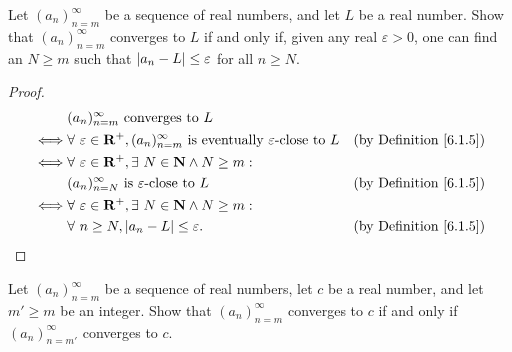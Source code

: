\begin{exercise}\label{ex 6.1.2}
    Let \((a_n)_{n = m}^\infty\) be a sequence of real numbers, and let \(L\) be a real number.
    Show that \((a_n)_{n = m}^\infty\) converges to \(L\) if and only if, given any real \(\varepsilon > 0\), one can find an \(N \geq m\) such that \(\abs*{a_n - L} \leq \varepsilon\) for all \(n \geq N\).
\end{exercise}

\begin{proof}
    \begin{align*}
             & (a_n)_{n = m}^\infty \text{ converges to } L                                                                                                           \\
        \iff & \forall\ \varepsilon \in \mathbf{R}^+, (a_n)_{n = m}^\infty \text{ is eventually } \varepsilon\text{-close to } L & \text{(by Definition \ref{6.1.5})} \\
        \iff & \forall\ \varepsilon \in \mathbf{R}^+, \exists\ N \in \mathbf{N} \land N \geq m :                                                                      \\
             & (a_n)_{n = N}^\infty \text{ is } \varepsilon\text{-close to } L                                                   & \text{(by Definition \ref{6.1.5})} \\
        \iff & \forall\ \varepsilon \in \mathbf{R}^+, \exists\ N \in \mathbf{N} \land N \geq m :                                                                      \\
             & \forall\ n \geq N, \abs*{a_n - L} \leq \varepsilon.                                                               & \text{(by Definition \ref{6.1.5})}
    \end{align*}
\end{proof}

\begin{exercise}\label{ex 6.1.3}
    Let \((a_n)_{n = m}^\infty\) be a sequence of real numbers, let \(c\) be a real number, and let \(m' \geq m\) be an integer.
    Show that \((a_n)_{n = m}^\infty\) converges to \(c\) if and only if \((a_n)_{n = m'}^\infty\) converges to \(c\).
\end{exercise}

